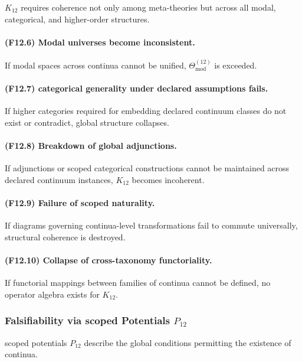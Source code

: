$K_{12}$ requires coherence not only among meta-theories but across all
modal, categorical, and higher-order structures.

\paragraph{(F12.6) Modal universes become inconsistent.}
If modal spaces across continua cannot be unified,  
$\Theta_{\mathrm{mod}}^{(12)}$ is exceeded.

\paragraph{(F12.7) categorical generality under declared assumptions fails.}
If higher categories required for embedding declared continuum classes do not exist or
contradict, global structure collapses.

\paragraph{(F12.8) Breakdown of global adjunctions.}
If adjunctions or scoped categorical constructions cannot be
maintained across declared continuum instances, $K_{12}$ becomes incoherent.

\paragraph{(F12.9) Failure of scoped naturality.}
If diagrams governing continua-level transformations fail to commute
universally, structural coherence is destroyed.

\paragraph{(F12.10) Collapse of cross-taxonomy functoriality.}
If functorial mappings between families of continua cannot be defined,
no operator algebra exists for $K_{12}$.



\subsubsection{Falsifiability via scoped Potentials $P_{12}$}

scoped potentials $P_{12}$ describe the global conditions permitting
the existence of continua.

